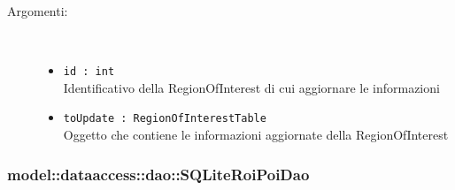 \documentclass[../DefinizioneDiProdotto.tex]{subfiles}
\begin{document}
\begin{description}
\begin{itemize}
 \begin{description}
\item[Argomenti:] \
\begin{itemize}
\item \texttt{id : int}\\
Identificativo della RegionOfInterest di cui aggiornare le informazioni\item \texttt{toUpdate : RegionOfInterestTable}\\
Oggetto che contiene le informazioni aggiornate della RegionOfInterest\end{itemize}
\end{description}
\end{itemize}
\end{description}

\subsubsection{model::dataaccess::dao::SQLiteRoiPoiDao}
\end{document}
